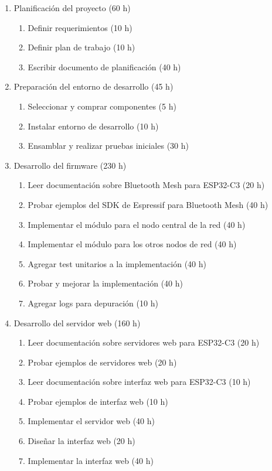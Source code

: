 \documentclass[
11pt, %
]{charter}
\begin{document}
\begin{enumerate}
\item  Planificación del proyecto (60 h)
	\begin{enumerate}
	\item Definir requerimientos (10 h)
	\item Definir plan de trabajo (10 h)
	\item Escribir documento de planificación (40 h)
	\end{enumerate}

\item Preparación del entorno de desarrollo (45 h)
	\begin{enumerate}
	\item Seleccionar y comprar componentes (5 h)
	\item Instalar entorno de desarrollo (10 h)
	\item Ensamblar y realizar pruebas iniciales (30 h)
	\end{enumerate}

\item Desarrollo del firmware (230 h)
	\begin{enumerate}
	\item Leer documentación sobre Bluetooth Mesh para ESP32-C3 (20 h)
	\item Probar ejemplos del SDK de Espressif para Bluetooth Mesh (40 h)
	\item Implementar el módulo para el nodo central de la red (40 h)	
	\item Implementar el módulo para los otros nodos de red (40 h)
	\item Agregar test unitarios a la implementación (40 h)
	\item Probar y mejorar la implementación (40 h)
	\item Agregar logs para depuración (10 h)
	\end{enumerate}

\item Desarrollo del servidor web (160 h)
	\begin{enumerate}
	\item Leer documentación sobre servidores web para ESP32-C3 (20 h)
	\item Probar ejemplos de servidores web (20 h)
	\item Leer documentación sobre interfaz web para ESP32-C3 (10 h)
	\item Probar ejemplos de interfaz web (10 h)
	\item Implementar el servidor web (40 h)
	\item Diseñar la interfaz web (20 h)
	\item Implementar la interfaz web (40 h)
	\end{enumerate}


\end{enumerate}
\end{document}
